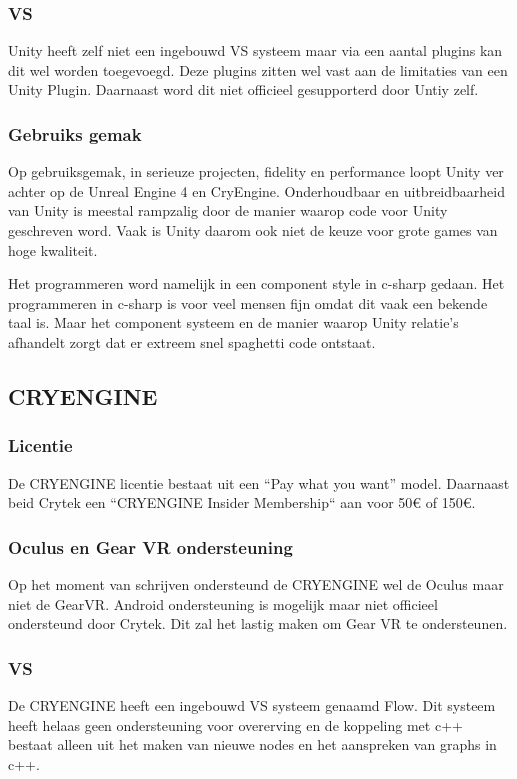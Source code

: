 \subsubsection{VS}
Unity heeft zelf niet een ingebouwd VS systeem maar via een aantal plugins kan dit wel worden toegevoegd. Deze plugins zitten wel vast aan de limitaties van een Unity Plugin. Daarnaast word dit niet officieel gesupporterd door Untiy zelf.

\subsubsection{Gebruiks gemak}
Op gebruiksgemak, in serieuze projecten, fidelity en performance loopt Unity ver achter op de Unreal Engine 4 en CryEngine. Onderhoudbaar en uitbreidbaarheid van Unity is meestal rampzalig door de manier waarop code voor Unity geschreven word. Vaak is Unity daarom ook niet de keuze voor grote games van hoge kwaliteit. 

Het programmeren word namelijk in een component style in c-sharp gedaan. Het programmeren in c-sharp is voor veel mensen fijn omdat dit vaak een bekende taal is. Maar het component systeem en de manier waarop Unity relatie’s afhandelt zorgt dat er extreem snel spaghetti code ontstaat. 

\subsection{CRYENGINE}
\subsubsection{Licentie}
De CRYENGINE licentie bestaat uit een “Pay what you want” model. Daarnaast beid Crytek een “CRYENGINE Insider Membership“ aan voor 50€ of 150€. 

\subsubsection{Oculus en Gear VR ondersteuning}
Op het moment van schrijven ondersteund de CRYENGINE wel de Oculus maar niet de GearVR. Android ondersteuning is mogelijk maar niet officieel ondersteund door Crytek. Dit zal het lastig maken om Gear VR te ondersteunen.

\subsubsection{VS}
De CRYENGINE heeft een ingebouwd VS systeem genaamd Flow. Dit systeem heeft helaas geen ondersteuning voor overerving en de koppeling met c++ bestaat alleen uit het maken van nieuwe nodes en het aanspreken van graphs in c++.

